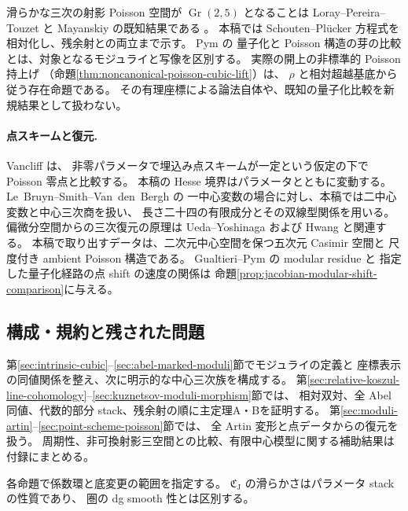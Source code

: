 \documentclass[11pt,a4paper]{ltjsarticle}
\numberwithin{equation}{section}
\begin{document}
滑らかな三次の射影 Poisson 空間が $\operatorname{Gr}(2,5)$ となることは
Loray--Pereira--Touzet と Mayanskiy の既知結果である
\cite[Theorem~9.1]{LPT}\cite[Theorem~1 and \S2.2]{Mayanskiy}。
本稿では Schouten--Pl\"ucker 方程式を相対化し、残余射との両立まで示す。
Pym \cite[Theorem~2.3, Proposition~2.9 and Theorem~2.10]{Pym} の
量子化と Poisson 構造の芽の比較とは、対象となるモジュライと写像を区別する。
実際の開上の非標準的 Poisson 持上げ
（命題\ref{thm:noncanonical-poisson-cubic-lift}）は、
$\rho$ と相対超越基底から従う存在命題である。
その有理座標による論法自体や、既知の量子化比較を新規結果として扱わない。

\paragraph{点スキームと復元.}
Vancliff \cite[\S6, Proposition~6.17 and Theorem~6.18]{VancliffQuantumSpaces} は、
非零パラメータで埋込み点スキームが一定という仮定の下で Poisson 零点と比較する。
本稿の Hesse 境界はパラメータとともに変動する。
Le~Bruyn--Smith--Van~den~Bergh
\cite[Theorem~4.2.2 and Propositions~4.2.5,4.3.7]{LeBruynSmithVdBCentral}の
一中心変数の場合に対し、本稿では二中心変数と中心三次商を扱い、
長さ二十四の有限成分とその双線型関係を用いる。
偏微分空間からの三次復元の原理は Ueda--Yoshinaga
\cite[\S3, Lemma~3]{UedaYoshinagaJacobian} および Hwang
\cite[Theorems~1.5--1.6]{HwangSymmetrizer}と関連する。
本稿で取り出すデータは、二次元中心空間を保つ五次元 Casimir 空間と
尺度付き ambient Poisson 構造である。
Gualtieri--Pym \cite[Theorem~7.2]{GualtieriPym} の modular residue と
指定した量子化経路の点 shift の速度の関係は
命題\ref{prop:jacobian-modular-shift-comparison}に与える。

\subsection{構成・規約と残された問題}

第\ref{sec:intrinsic-cubic}--\ref{sec:abel-marked-moduli}節でモジュライの定義と
座標表示の同値関係を整え、次に明示的な中心三次族を構成する。
第\ref{sec:relative-koszul-line-cohomology}--\ref{sec:kuznetsov-moduli-morphism}節では、
相対双対、全 Abel 同値、代数的部分 stack、残余射の順に主定理A・Bを証明する。
第\ref{sec:moduli-artin}--\ref{sec:point-scheme-poisson}節では、
全 Artin 変形と点データからの復元を扱う。
周期性、非可換射影三空間との比較、有限中心模型に関する補助結果は付録にまとめる。

各命題で係数環と底変更の範囲を指定する。
$\mathfrak C_{\mathrm J}$ の滑らかさはパラメータ stack の性質であり、
圏の dg smooth 性とは区別する。
\end{document}
